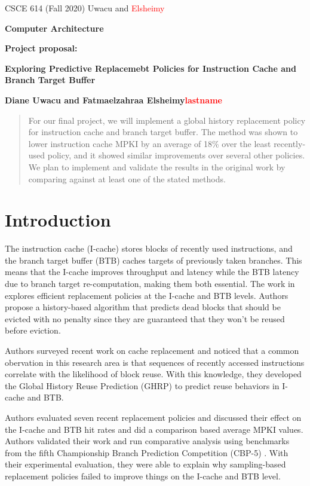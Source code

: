 \documentclass[11pt]{article}
\begin{document}
\centerline{CSCE 614 (Fall 2020) \hfill Uwacu and \textcolor{red}{Elsheimy}}
\medskip
\centerline{\bf Computer Architecture}
\medskip

\centerline{\bf  Project proposal: }

\bigskip

\centerline{\bf Exploring Predictive Replacemebt Policies for Instruction Cache and Branch Target Buffer}

\bigskip

\centerline{\bf Diane Uwacu and Fatmaelzahraa Elsheimy\textcolor{red}{lastname}}

\bigskip

\begin{abstract}
	For our final project, we will implement a global history replacement policy for instruction cache and branch target buffer.
	The method was shown to lower instruction cache MPKI by an average of 18\% over the least recently-used policy, and it showed
	similar improvements over several other policies.
	We plan to implement and validate the results in the original work by comparing against at least one of the stated methods.
\end{abstract}

\section{Introduction} 
\label{sec:introduction}

The instruction cache (I-cache) stores blocks of recently used instructions, and the branch target buffer (BTB) caches targets of previously taken branches. 
This means that the I-cache improves throughput and latency while the BTB latency due to branch target re-computation, making them both essential.
The work in \cite{samira-ISCA18} explores efficient replacement policies at the I-cache and BTB levels. Authors propose a history-based algorithm that predicts
dead blocks that should be evicted with no penalty since they are guaranteed that they won't be reused before eviction.

Authors surveyed recent work on cache replacement and noticed that a common obervation in this research area is that sequences of recently accessed instructions
correlate with the likelihood of block reuse. With this knowledge, they developed the Global History Reuse Prediction (GHRP) to predict reuse behaviors in I-cache and BTB.

Authors evaluated seven recent replacement policies and discussed their effect on the I-cache and BTB hit rates and did a comparison based average MPKI values.
Authors validated their work and run comparative analysis using benchmarks from the fifth Championship Branch Prediction Competition (CBP-5) \cite{cbp-5}.
With their experimental evaluation, they were able to explain why sampling-based replacement policies failed to improve things on the I-cache and BTB level.
\end{document}
